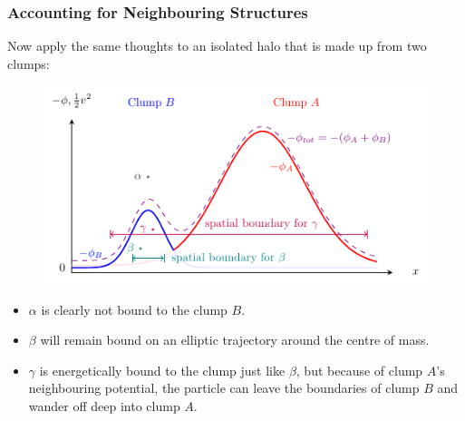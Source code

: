 \begin{frame}
	\frametitle{Accounting for Neighbouring Structures}
	
	Now apply the same thoughts to an isolated halo that is made up from two clumps:
	
	
	\begin{figure}
		\centering
		\includegraphics[width=.8\textwidth]{../report/images/tikz/potentials.pdf}
	\end{figure}
	
	\begin{itemize}
		\small
		\item $\alpha$ is clearly not bound to the clump $B$.
		\item $\beta$ will remain bound on an elliptic trajectory around the centre of mass.
		\item $\gamma$ is energetically bound to the clump just like $\beta$, but because of clump $A$'s neighbouring potential, the particle can leave the boundaries of clump $B$ and wander off deep into clump $A$.
	\end{itemize}
	

\end{frame}








